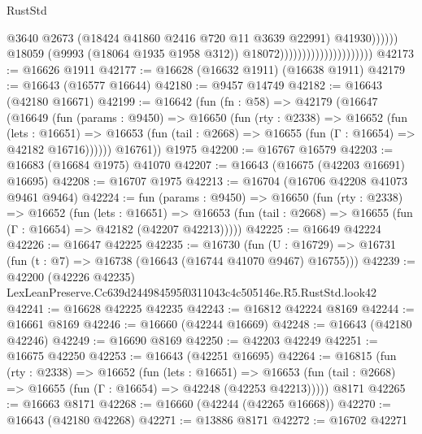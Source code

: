 \begin{lexlean}{RustStd}
\begin{coremodule}
                                                          @3640
                                                          @2673
                                                          (@18424
                                                            @41860
                                                            @2416
                                                            @720
                                                            @11
                                                            @3639
                                                            @22991)
                                                          @41930))))))
                                              @18059
                                              (@9993 (@18064 @1935 @1958 @312))
                                              @18072)))))))))))))))))))))
@42173 := @16626 @1911
@42177 := @16628 (@16632 @1911) (@16638 @1911)
@42179 := @16643 (@16577 @16644)
@42180 := @9457 @14749
@42182 := @16643 (@42180 @16671)
@42199 := @16642
    (fun (fn : @58) =>
    @42179
      (@16647
        (@16649
          (fun (params : @9450) =>
          @16650
            (fun (rty : @2338) =>
            @16652
              (fun (lets : @16651) =>
              @16653 (fun (tail : @2668) => @16655 (fun (Γ : @16654) => @42182 @16716))))))
        @16761))
    @1975
@42200 := @16767 @16579
@42203 := @16683 (@16684 @1975) @41070
@42207 := @16643 (@16675 (@42203 @16691) @16695)
@42208 := @16707 @1975
@42213 := @16704 (@16706 @42208 @41073 @9461 @9464)
@42224 := fun (params : @9450) =>
  @16650
    (fun (rty : @2338) =>
    @16652
      (fun (lets : @16651) =>
      @16653 (fun (tail : @2668) => @16655 (fun (Γ : @16654) => @42182 (@42207 @42213)))))
@42225 := @16649 @42224
@42226 := @16647 @42225
@42235 := @16730
    (fun (U : @16729) => @16731 (fun (t : @7) => @16738 (@16643 (@16744 @41070 @9467) @16755)))
@42239 := @42200 (@42226 @42235) LexLeanPreserve.Cc639d244984595f0311043c4c505146e.R5.RustStd.look42
@42241 := @16628 @42225 @42235
@42243 := @16812 @42224 @8169
@42244 := @16661 @8169
@42246 := @16660 (@42244 @16669)
@42248 := @16643 (@42180 @42246)
@42249 := @16690 @8169
@42250 := @42203 @42249
@42251 := @16675 @42250
@42253 := @16643 (@42251 @16695)
@42264 := @16815
    (fun (rty : @2338) =>
    @16652
      (fun (lets : @16651) =>
      @16653 (fun (tail : @2668) => @16655 (fun (Γ : @16654) => @42248 (@42253 @42213)))))
    @8171
@42265 := @16663 @8171
@42268 := @16660 (@42244 (@42265 @16668))
@42270 := @16643 (@42180 @42268)
@42271 := @13886 @8171
@42272 := @16702 @42271

\end{coremodule}
\end{lexlean}
